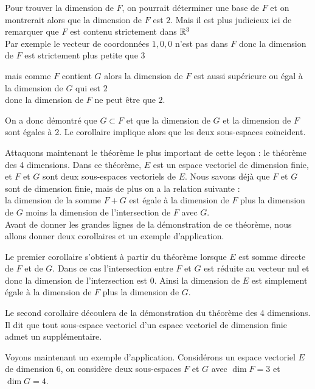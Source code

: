 \change
Pour trouver la dimension de $F$, on pourrait déterminer une base 
de $F$ et on montrerait alors que la dimension de $F$ est $2$.
Mais il est plus judicieux ici de remarquer que $F$ est contenu strictement dans $\mathbb{R}^3$ \\

Par exemple le vecteur de coordonnées $1, 0, 0$  n'est pas dans $F$
donc la dimension de $F$ est strictement plus petite que 3

\change
mais comme  $F$ contient $G$ alors la dimension de $F$ est aussi supérieure ou égal à la dimension de $G$ qui est $2$\\

donc la dimension de $F$ ne peut être que $2$.
  
  \change
  On a donc démontré que $G \subset F$ et que la dimension de $G$ et la dimension de $F$ sont égales à 2. 
  Le corollaire implique alors que  les deux sous-espaces co\"{i}ncident.

\diapo
Attaquons maintenant le théorème le plus important de cette le\c{c}on : le théorème des 4 dimensions. 
Dans ce théorème, $E$ est un espace vectoriel de dimension finie, 
et $F$ et $G$ sont deux sous-espaces vectoriels de $E$. Nous savons déjà que $F$ et $G$ sont de dimension finie, mais de plus on a la relation suivante : \\

la dimension de la somme $F+G$ est égale à la dimension de $F$ plus la dimension de $G$ moins la dimension de l'intersection de $F$ avec $G$. \\

Avant de donner les grandes lignes de la démonstration de ce théorème, nous allons donner deux corollaires et un exemple d'application.

\change
Le premier corollaire s'obtient à partir du théorème lorsque $E$ est somme directe de $F$ et  de $G$. Dans ce cas l'intersection entre $F$ et $G$ est réduite 
au vecteur nul et donc la dimension de l'intersection est 0. 
Ainsi la dimension de $E$ est simplement égale à la dimension de $F$ plus la dimension de $G$.

\change
Le second corollaire découlera de la démonstration du théorème des 4 dimensions. Il dit que tout sous-espace vectoriel d'un espace vectoriel de dimension finie admet un supplémentaire.

\diapo
Voyons maintenant un exemple d'application. Considérons  un espace vectoriel $E$ de dimension $6$, on considère deux sous-espaces $F$ et $G$ avec
$\dim F=3$ et $\dim G=4$. 


